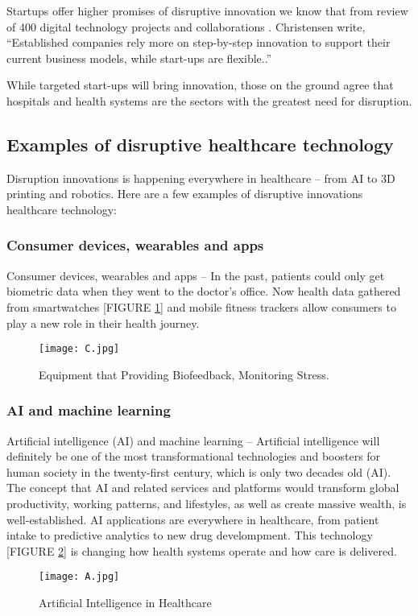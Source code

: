 \documentclass[12pt]{article}
\begin{document}
Startups offer higher promises of disruptive innovation we know that from review of 400 digital technology projects and collaborations . Christensen write, “Established companies rely more on step-by-step innovation to support their current business models, while start-ups are flexible..”

While targeted start-ups will bring innovation, those on the ground agree that hospitals and health systems are the sectors with the greatest need for disruption. 
\clearpage
\subsection{Examples of disruptive healthcare technology}
Disruption innovations is happening everywhere in healthcare – from AI to  3D printing and robotics. Here are a few  examples of disruptive innovations healthcare technology:
\subsubsection{Consumer devices, wearables and apps }
Consumer devices, wearables and apps – In the past, patients could only get biometric data when they went to the doctor’s office. Now health data gathered from smartwatches [FIGURE \ref{fig_C}] and mobile fitness trackers allow consumers to play a new role in their health journey.
\begin{figure}[h]
\centering
\texttt{[image: C.jpg]}
\caption{Equipment that  Providing Biofeedback, Monitoring Stress.}
\label{fig_C}
\end{figure}
\subsubsection{AI and machine learning }
Artificial intelligence (AI) and machine learning – Artificial intelligence will definitely be one of the most transformational technologies and boosters for human society in the twenty-first century, which is only two decades old (AI). The concept that AI and related services and platforms would transform global productivity, working patterns, and lifestyles, as well as create massive wealth, is well-established.  AI applications are everywhere in healthcare, from patient intake to predictive analytics to new drug develompment. This technology [FIGURE \ref{fig_A}]  is changing how health systems operate and how care is delivered.
\begin{figure}[h]
\centering
\texttt{[image: A.jpg]}
\caption{Artificial Intelligence in Healthcare}
\label{fig_A}
\end{figure}
\clearpage
\end{document}
